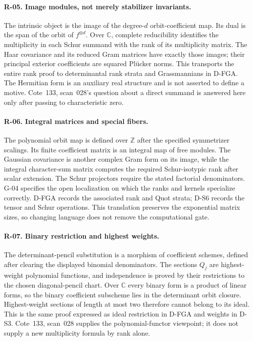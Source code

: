 \documentclass[11pt,a4paper]{article}
\theoremstyle{definition}\newtheorem{definition}{Definition}
\begin{document}
\paragraph{R-05. Image modules, not merely stabilizer invariants.}
The intrinsic object is the image of the degree-$d$ orbit-coefficient map. Its dual is the span of the orbit of $f^{\otimes d}$. Over $\mathbb C$, complete reducibility identifies the multiplicity in each Schur summand with the rank of its multiplicity matrix. The Haar covariance and its reduced Gram matrices have exactly those images; their principal exterior coefficients are squared Pl\"ucker norms. This transports the entire rank proof to determinantal rank strata and Grassmannians in D-FGA. The Hermitian form is an auxiliary real structure and is not asserted to define a motive. Cote~133, scan~028's question about a direct summand is answered here only after passing to characteristic zero.

\paragraph{R-06. Integral matrices and special fibers.}
The polynomial orbit map is defined over $\mathbb Z$ after the specified symmetrizer scalings. Its finite coefficient matrix is an integral map of free modules. The Gaussian covariance is another complex Gram form on its image, while the integral character-sum matrix computes the required Schur-isotypic rank after scalar extension. The Schur projectors require the stated factorial denominators. G-04 specifies the open localization on which the ranks and kernels specialize correctly. D-FGA records the associated rank and Quot strata; D-S6 records the tensor and Schur operations. This translation preserves the exponential matrix sizes, so changing language does not remove the computational gate.

\paragraph{R-07. Binary restriction and highest weights.}
The determinant-pencil substitution is a morphism of coefficient schemes, defined after clearing the displayed binomial denominators. The sections $Q_j$ are highest-weight polynomial functions, and independence is proved by their restrictions to the chosen diagonal-pencil chart. Over $\mathbb C$ every binary form is a product of linear forms, so the binary coefficient subscheme lies in the determinant orbit closure. Highest-weight sections of length at most two therefore cannot belong to its ideal. This is the same proof expressed as ideal restriction in D-FGA and weights in D-S3. Cote~133, scan~028 supplies the polynomial-functor viewpoint; it does not supply a new multiplicity formula by rank alone.
\end{document}
